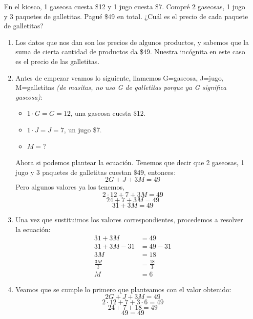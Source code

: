 \documentclass{article}
\begin{document}
\begin{ejemplo}
En el kiosco, 1 gaseosa cuesta \$12 y 1 jugo cuesta \$7.
Compré 2 gaseosas, 1 jugo y 3 paquetes de galletitas. Pagué \$49 en total.
¿Cuál es el precio de cada paquete de galletitas?

\begin{enumerate}
	\item Los datos que nos dan son los precios de algunos productos, y sabemos que la suma de cierta cantidad de productos da \$49. Nuestra incógnita en este caso es el precio de las galletitas.
	\item Antes de empezar veamos lo siguiente, llamemos G=gaseosa, J=jugo, M=galletitas \textit{(de masitas, no uso G de galletitas porque ya G significa gaseosa)}:
		\begin{itemize}
			\item $1\cdot G=G=12$, una gaseosa cuesta \$12.
			\item $1\cdot J=J=7$, un jugo \$7.
			\item $M=?$
		\end{itemize}
	Ahora si podemos plantear la ecuación. Tenemos que decir que 2 gaseosas, 1 jugo y 3 paquetes de galletitas cuestan \$49, entonces:
	\[2G+J+3M=49\]
	Pero algunos valores ya los tenemos,
	\[2\cdot12+7+3M=49\]
	\[24+7+3M=49\]
	\[31+3M=49\]
	\item Una vez que sustituimos los valores correspondientes, procedemos a resolver la ecuación:
		\begin{align}
		31+3M&=49\nonumber\\
		31+3M-31&=49-31\nonumber\\
		3M&=18\nonumber\\
		\frac{3M}{3}&=\frac{18}{3}\nonumber\\
		M&=6\nonumber
		\end{align}
	\item Veamos que se cumple lo primero que planteamos con el valor obtenido:
	\[2G+J+3M=49\]
	\[2\cdot12+7+3\cdot6=49\]
	\[24+7+18=49\]
	\[49=49\]
\end{enumerate}

\end{ejemplo}
\end{document}
